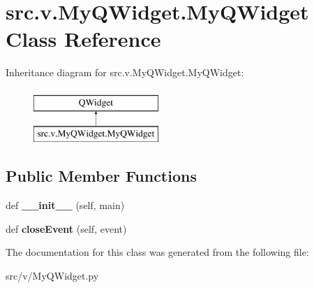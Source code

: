 \hypertarget{classsrc_1_1v_1_1_my_q_widget_1_1_my_q_widget}{}\section{src.\+v.\+My\+Q\+Widget.\+My\+Q\+Widget Class Reference}
\label{classsrc_1_1v_1_1_my_q_widget_1_1_my_q_widget}
Inheritance diagram for src.\+v.\+My\+Q\+Widget.\+My\+Q\+Widget\+:\begin{figure}[H]
\begin{center}
\leavevmode
\includegraphics[height=2.000000cm]{classsrc_1_1v_1_1_my_q_widget_1_1_my_q_widget}
\end{center}
\end{figure}
\subsection*{Public Member Functions}
\begin{DoxyCompactItemize}
\item 
\hypertarget{classsrc_1_1v_1_1_my_q_widget_1_1_my_q_widget_ada2149a89429788c8f3f232fa59851b5}{}def {\bfseries \+\_\+\+\_\+init\+\_\+\+\_\+} (self, main)\label{classsrc_1_1v_1_1_my_q_widget_1_1_my_q_widget_ada2149a89429788c8f3f232fa59851b5}

\item 
\hypertarget{classsrc_1_1v_1_1_my_q_widget_1_1_my_q_widget_a45ede0aa7091f80a0ec5651c20680bce}{}def {\bfseries close\+Event} (self, event)\label{classsrc_1_1v_1_1_my_q_widget_1_1_my_q_widget_a45ede0aa7091f80a0ec5651c20680bce}

\end{DoxyCompactItemize}


The documentation for this class was generated from the following file\+:\begin{DoxyCompactItemize}
\item 
src/v/My\+Q\+Widget.\+py\end{DoxyCompactItemize}
